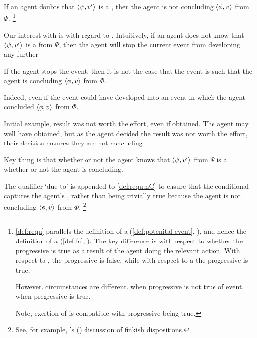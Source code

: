 \begin{note}
  If an agent doubts that \(\langle \psi, v' \rangle\) is a \fc{}, then the agent is not concluding \(\langle \phi, v \rangle\) from \(\Phi\).%
  \footnote{
    \autoref{def:requ} parallels the definition of a \pevent{} (\autoref{def:potenital-event}, ), and hence the definition of a \fc{} (\autoref{def:fc}, ).
    The key difference is with respect to whether the progressive is true as a result of the agent doing the relevant action.
    With respect to \ninf{}, the progressive is false, while with respect to a  the progressive is true.

    However, circumstances are different.
    \pevent{} when progressive is not true of event.
    \ninf{} when progressive is true.

    Note, exertion of \ninf{} is compatible with progressive being true.
  }
\end{note}

\begin{note}
  Our interest with  is with regard to .
  Intuitively, if an agent does not know that \(\langle \psi, v' \rangle\) is a \fc{} from \(\Psi\), then the agent will stop the current event from developing any further

  If the agent stops the event, then it is not the case that the event is such that the agent is concluding \(\langle \phi, v \rangle\) from \(\Phi\).

  Indeed, even if the event could have developed into an event in which the agent concluded \(\langle \phi, v \rangle\) from \(\Phi\).

  Initial example, result was not worth the effort, even if obtained.
  The agent may well have obtained, but as the agent decided the result was not worth the effort, their decision ensures they are not concluding.
\end{note}

\begin{note}
  Key thing is that whether or not the agent knows that \(\langle \psi, v' \rangle\) from \(\Psi\) is a \fc{}  whether or not the agent is concluding.
\end{note}

\begin{note}
  The qualifier `due to' is appended to \ref{def:requ:nC} to ensure that the conditional captures the agent's \ninf{}, rather than being trivially true because the agent is not concluding \(\langle \phi, v \rangle\) from \(\Phi\).%
  \footnote{
    See, for example, \citeauthor{Lewis:1997wg}'s (\citeyear{Lewis:1997wg}) discussion of finkish dispositions.
  }
\end{note}

